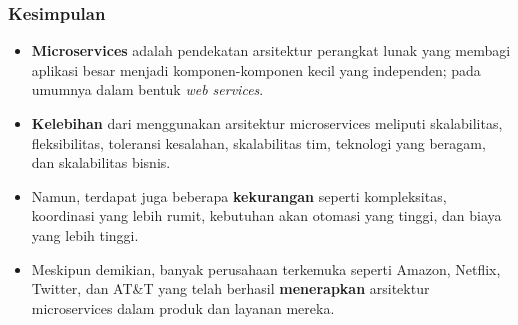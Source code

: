 \documentclass[aspectratio=169, table]{beamer}
\begin{document}
    \begin{frame}
        \frametitle{Kesimpulan}
        \vspace{25pt}
        \begin{itemize}
            \item \textbf{Microservices} adalah pendekatan arsitektur perangkat lunak yang membagi aplikasi besar menjadi komponen-komponen kecil yang independen; pada umumnya dalam bentuk \textit{web services}.
            \item \textbf{Kelebihan} dari menggunakan arsitektur microservices meliputi skalabilitas, fleksibilitas, toleransi kesalahan, skalabilitas tim, teknologi yang beragam, dan skalabilitas bisnis.
            \item Namun, terdapat juga beberapa \textbf{kekurangan} seperti kompleksitas, koordinasi yang lebih rumit, kebutuhan akan otomasi yang tinggi, dan biaya yang lebih tinggi.
            \item Meskipun demikian, banyak perusahaan terkemuka seperti Amazon, Netflix, Twitter, dan AT\&T yang telah berhasil \textbf{menerapkan} arsitektur microservices dalam produk dan layanan mereka.
        \end{itemize}
    \end{frame}
\end{document}
